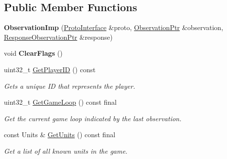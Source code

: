\subsection*{Public Member Functions}
\begin{DoxyCompactItemize}
\item 
\mbox{\label{classsc2_1_1_observation_imp_a862b6bc29806a415caafa84add850e12}} 
{\bfseries Observation\+Imp} (\hyperlink{classsc2_1_1_proto_interface}{Proto\+Interface} \&proto, \hyperlink{classsc2_1_1_message_response_ptr}{Observation\+Ptr} \&observation, \hyperlink{classsc2_1_1_message_response_ptr}{Response\+Observation\+Ptr} \&response)
\item 
\mbox{\label{classsc2_1_1_observation_imp_a5d6f5926e68ebeae4f2e8b21d8566f45}} 
void {\bfseries Clear\+Flags} ()
\item 
\mbox{\label{classsc2_1_1_observation_imp_ae86306fc8a2112ca042234e97f5a8b90}} 
uint32\+\_\+t \hyperlink{classsc2_1_1_observation_imp_ae86306fc8a2112ca042234e97f5a8b90}{Get\+Player\+ID} () const
\begin{DoxyCompactList}\small\item\em Gets a unique ID that represents the player. \end{DoxyCompactList}\item 
\mbox{\label{classsc2_1_1_observation_imp_a3609e4280e31b27e0e35a08cfbe757ca}} 
uint32\+\_\+t \hyperlink{classsc2_1_1_observation_imp_a3609e4280e31b27e0e35a08cfbe757ca}{Get\+Game\+Loop} () const final
\begin{DoxyCompactList}\small\item\em Get the current game loop indicated by the last observation. \end{DoxyCompactList}\item 
\mbox{\label{classsc2_1_1_observation_imp_a0c3f520595df2948ca7f2a1432b1dcae}} 
const Units \& \hyperlink{classsc2_1_1_observation_imp_a0c3f520595df2948ca7f2a1432b1dcae}{Get\+Units} () const final
\begin{DoxyCompactList}\small\item\em Get a list of all known units in the game. \end{DoxyCompactList}\item 

\end{DoxyCompactItemize}
